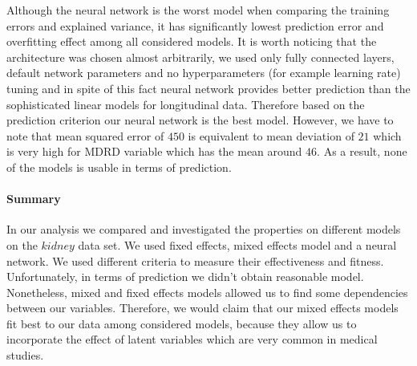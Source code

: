 \documentclass[num-refs]{wiley-article}
\begin{document}
Although the neural network is the worst model when comparing the training errors and explained variance, it has significantly lowest prediction error and overfitting effect among all considered models. It is worth noticing that the architecture was chosen almost arbitrarily, we used only fully connected layers, default network parameters and no hyperparameters (for example learning rate) tuning and in spite of this fact neural network provides better prediction than the sophisticated linear models for longitudinal data. Therefore based on the prediction criterion our neural network is the best model. However, we have to note that mean squared error of $450$ is equivalent to mean deviation of $21$ which is very high for MDRD variable which has the mean around $46$. As a result, none of the models is usable in terms of prediction. 

\paragraph{Summary}

In our analysis we compared and investigated the properties on different models on the $kidney$ data set. We used fixed effects, mixed effects model and a neural network. We used different criteria to measure their effectiveness and fitness. Unfortunately, in terms of prediction we didn't obtain reasonable model. Nonetheless, mixed and fixed effects models allowed us to find some dependencies between our variables. Therefore, we would claim that our mixed effects models fit best to our data among considered models, because they allow us to incorporate the effect of latent variables which are very common in medical studies.

\newpage

\end{document}
